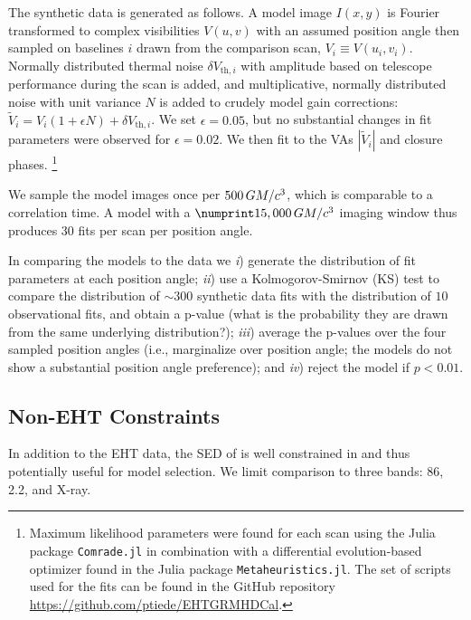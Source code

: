 The synthetic data is generated as follows.
A model image $I(x,y)$ is Fourier transformed to complex visibilities $V(u,v)$ with an assumed position angle then sampled on baselines $i$ drawn from the comparison scan, $V_i \equiv V(u_i,v_i)$.
Normally distributed thermal noise $\delta V_{\mathrm{th},i}$ with amplitude based on telescope performance during the scan is added, and multiplicative, normally distributed noise with unit variance $N$ is added to crudely model gain corrections: $\tilde{V}_i = V_i (1 + \epsilon N) + \delta V_{\mathrm{th},i}$.
We set $\epsilon = 0.05$, but no substantial changes in fit parameters were observed for $\epsilon = 0.02$.
We then fit to the VAs $|\tilde{V}_i|$ and closure phases.
\footnote{Maximum likelihood \mring parameters were found for each scan using the Julia package \texttt{Comrade.jl} \citep{comrade} in combination with a differential evolution-based optimizer
found in the Julia package \texttt{Metaheuristics.jl}.  The set of scripts used for the fits can be found in the GitHub repository \url{https://github.com/ptiede/EHTGRMHDCal}.}

We sample the model images once per $500\,GM/c^3$, which is comparable to a correlation time.
A model with a $\no{15,000}\,\tg$ imaging window thus produces $30$ fits per scan per position angle.

In comparing the models to the data we
\emph{i}) generate the distribution of fit parameters at each position angle;
\emph{ii}) use a Kolmogorov-Smirnov (KS) test to compare the distribution of $\sim 300$ synthetic data fits with the distribution of $10$ observational fits, and obtain a p-value (what is the probability they are drawn from the same underlying distribution?);
\emph{iii}) average the p-values over the four sampled position angles (i.e., marginalize over position angle; the models do not show a substantial position angle preference); and
\emph{iv}) reject the model if $p < 0.01$.

\subsection{Non-EHT Constraints}

In addition to the EHT data, the SED of \sgra is well constrained in  and thus potentially useful for model selection.
We limit comparison to three bands: 86\GHz, 2.2\um, and X-ray.

